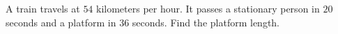 A train travels at $54$ kilometers per hour. It passes a stationary person in $20$ seconds and a platform in $36$ seconds. Find the platform length.
